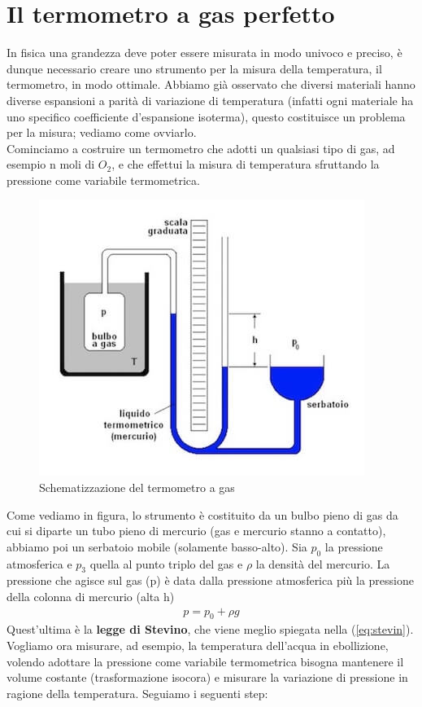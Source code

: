 \documentclass[10pt,a4paper]{article}
\begin{document}
\section{Il termometro a gas perfetto}\label{sec:termometroagasperfetto}
In fisica una grandezza deve poter essere misurata in modo univoco e preciso, è dunque necessario creare uno strumento per la misura della temperatura, il termometro, in modo ottimale. Abbiamo già osservato che diversi materiali hanno diverse espansioni a parità di variazione di temperatura (infatti ogni materiale ha uno specifico coefficiente d'espansione isoterma), questo costituisce un problema per la misura; vediamo come ovviarlo.\\
Cominciamo a costruire un termometro che adotti un qualsiasi tipo di gas, ad esempio n moli di $O_2$, e che effettui la misura di temperatura sfruttando la pressione come variabile termometrica.
\begin{figure}[h!]
	\centering
	\includegraphics[width=0.6\linewidth]{../images/termometro-a-gas}
	\caption{Schematizzazione del termometro a gas}
	\label{fig:termometro-a-gas}
\end{figure}
\FloatBarrier
Come vediamo in figura, lo strumento è costituito da un bulbo pieno di gas da cui si diparte un tubo pieno di mercurio (gas e mercurio stanno a contatto), abbiamo poi un serbatoio mobile (solamente basso-alto). Sia $p_0$ la pressione atmosferica e $p_3$ quella al punto triplo del gas e $\rho$ la densità del mercurio. La pressione che agisce sul gas (p) è data dalla pressione atmosferica più la pressione della colonna di mercurio (alta h)
\begin{align*}
	p = p_0 + \rho g
\end{align*}
Quest'ultima è la \textbf{legge di Stevino}, che viene meglio spiegata nella (\ref{eq:stevin}).\\
Vogliamo ora misurare, ad esempio, la temperatura dell'acqua in ebollizione, volendo adottare la pressione come variabile termometrica bisogna mantenere il volume costante (trasformazione isocora) e misurare la variazione di pressione in ragione della temperatura. Seguiamo i seguenti step:
\end{document}

